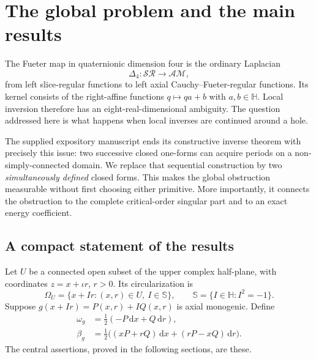 \documentclass[11pt,a4paper]{article}
\numberwithin{equation}{section}
\theoremstyle{definition}
\theoremstyle{remark}
\newcommand{\HH}{\mathbb H}
\newcommand{\SSS}{\mathbb S}
\newcommand{\SR}{\mathcal{SR}}
\newcommand{\AM}{\mathcal{AM}}
\newcommand{\Fu}{\Delta_4}
\newcommand{\dd}{\,\mathrm d}
\begin{document}
\newpage
\begingroup\small
\setlength{\parskip}{0pt}
\makeatletter
\patchcmd{\l@section}{1.0em}{0.45em}{}{}
\makeatother
\tableofcontents
\endgroup
\newpage

\section{The global problem and the main results}
\label{sec:intro}
The Fueter map in quaternionic dimension four is the ordinary Laplacian
\[
 \Fu:\SR\longrightarrow\AM,
\]
from left slice-regular functions to left axial Cauchy--Fueter-regular
functions. Its kernel consists of the right-affine functions $q\mapsto qa+b$
with $a,b\in\HH$. Local inversion therefore has an eight-real-dimensional
ambiguity. The question addressed here is what happens when local inverses
are continued around a hole.

The supplied expository manuscript \cite{companion} ends its constructive
inverse theorem with precisely this issue: two successive closed one-forms
can acquire periods on a non-simply-connected domain. We replace that
sequential construction by two \emph{simultaneously defined} closed forms.
This makes the global obstruction measurable without first choosing either
primitive. More importantly, it connects the obstruction to the complete
critical-order singular part and to an exact energy coefficient.

\subsection{A compact statement of the results}
Let $U$ be a connected open subset of the upper complex half-plane, with
coordinates $z=x+\iota r$, $r>0$. Its circularization is
\[
 \Omega_U=\{x+Ir:(x,r)\in U,\ I\in\SSS\},
 \qquad \SSS=\{I\in\HH:I^2=-1\}.
\]
Suppose $g(x+Ir)=P(x,r)+IQ(x,r)$ is axial monogenic. Define
\begin{align}
 \omega_g&=\frac12(-P\dd x+Q\dd r),\label{eq:intro-omega}\\
 \beta_g&=\frac12\bigl((xP+rQ)\dd x+(rP-xQ)\dd r\bigr).
 \label{eq:intro-beta}
\end{align}
The central assertions, proved in the following sections, are these.
\end{document}
